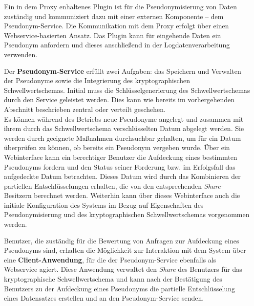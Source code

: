 Ein in dem Proxy enhaltenes Plugin ist für die Pseudonymisierung von Daten zuständig und kommuniziert dazu mit einer externen Komponente -- dem Pseudonym-Service. Die Kommunikation mit dem Proxy erfolgt über einen Webservice-basierten Ansatz. Das Plugin kann für eingehende Daten ein Pseudonym anfordern und dieses anschließend in der Logdatenverarbeitung verwenden.

Der \textbf{Pseudonym-Service} erfüllt zwei Aufgaben: das Speichern und Verwalten der Pseudonyme sowie die Integrierung des kryptographischen Schwellwertschemas. Initial muss die Schlüsselgenerierung des Schwellwertschemas durch den Service geleistet werden. Dies kann wie bereits im vorhergehenden Abschnitt beschrieben zentral oder verteilt geschehen.\\
Es können während des Betriebs neue Pseudonyme angelegt und zusammen mit ihrem durch das Schwellwertschema verschlüsselten Datum abgelegt werden. Sie werden durch geeignete Maßnahmen durchsuchbar gehalten, um für ein Datum überprüfen zu können, ob bereits ein Pseudonym vergeben wurde. 
Über ein Webinterface kann ein berechtiger Benutzer die Aufdeckung eines bestimmten Pseudonyms fordern und den Status seiner Forderung bzw. im Erfolgsfall das aufgedeckte Datum betrachten. Dieses Datum wird durch das Kombinieren der partiellen Entschlüsselungen erhalten, die von den entsprechenden \textit{Share}-Besitzern berechnet werden. Weiterhin kann über dieses Webinterface auch die initiale Konfiguration des Systems im Bezug auf Eigenschaften des Pseudonymisierung und des kryptographischen Schwellwertschemas vorgenommen werden.

Benutzer, die zuständig für die Bewertung von Anfragen zur Aufdeckung eines Pseudonyms sind, erhalten die Möglichkeit zur Interaktion mit dem System über eine \textbf{Client-Anwendung}, für die der Pseudonym-Service ebenfalls als Webservice agiert. Diese Anwendung verwaltet den \textit{Share} des Benutzers für das kryptographische Schwellwertschema und kann nach der Bestätigung des Benutzers zu der Aufdeckung eines Pseudonyms die partielle Entschlüsselung eines Datensatzes erstellen und an den Pseudonym-Service senden.
